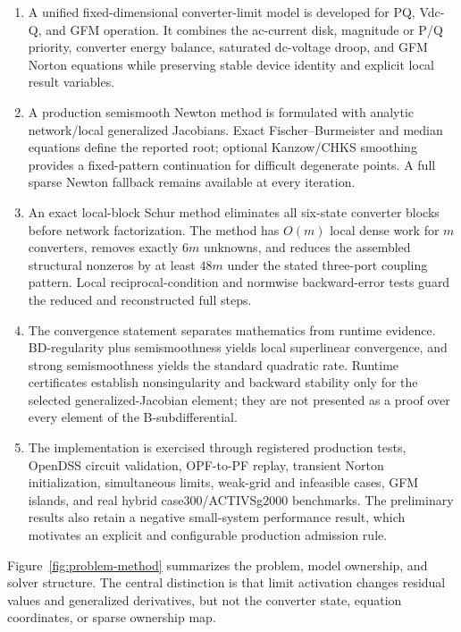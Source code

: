 \begin{enumerate}
  \item A unified fixed-dimensional converter-limit model is developed for
  PQ, Vdc-Q, and GFM operation. It combines the ac-current disk, magnitude or
  P/Q priority, converter energy balance, saturated dc-voltage droop, and GFM
  Norton equations while preserving stable device identity and explicit local
  result variables.

  \item A production semismooth Newton method is formulated with analytic
  network/local generalized Jacobians. Exact Fischer--Burmeister and median
  equations define the reported root; optional Kanzow/CHKS smoothing provides
  a fixed-pattern continuation for difficult degenerate points. A full sparse
  Newton fallback remains available at every iteration.

  \item An exact local-block Schur method eliminates all six-state converter
  blocks before network factorization. The method has $O(m)$ local dense work
  for $m$ converters, removes exactly $6m$ unknowns, and reduces the assembled
  structural nonzeros by at least $48m$ under the stated three-port coupling
  pattern. Local reciprocal-condition and normwise backward-error tests guard
  the reduced and reconstructed full steps.

  \item The convergence statement separates mathematics from runtime
  evidence. BD-regularity plus semismoothness yields local superlinear
  convergence, and strong semismoothness yields the standard quadratic rate.
  Runtime certificates establish nonsingularity and backward stability only
  for the selected generalized-Jacobian element; they are not presented as a
  proof over every element of the B-subdifferential.

  \item The implementation is exercised through registered production tests,
  OpenDSS circuit validation, OPF-to-PF replay, transient Norton initialization,
  simultaneous limits, weak-grid and infeasible cases, GFM islands, and real
  hybrid case300/ACTIVSg2000 benchmarks. The preliminary results also retain a
  negative small-system performance result, which motivates an explicit and
  configurable production admission rule.
\end{enumerate}

Figure~\ref{fig:problem-method} summarizes the problem, model ownership, and
solver structure. The central distinction is that limit activation changes
residual values and generalized derivatives, but not the converter state,
equation coordinates, or sparse ownership map.

